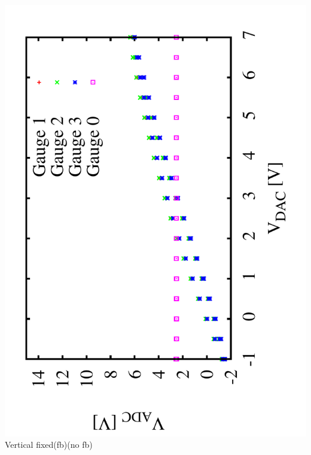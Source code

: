 \documentclass[a4paper,11pt]{book}
\begin{document}
 \includegraphics[angle=-90,scale=0.15]{image_ai_12.pdf}\\
 Vertical fixed\hspace{1.6cm}(fb)\hspace{3.0cm}(no fb)\\
\end{document}
